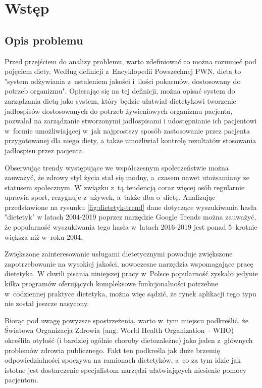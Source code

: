\chapter*{Wstęp}\label{ch:admission}

\section*{Opis problemu}\label{sec:problem-description}

Przed przejściem do analizy problemu, warto zdefiniować co można rozumieć pod pojęciem diety.
Według definicji z~Encyklopedii Powszechnej PWN, dieta to "system odżywiania z~ustaleniem jakości i~ilości pokarmów,
dostosowany do potrzeb organizmu"\cite{book:encyklopedia-dieta}.
Opierając się na tej definicji, można opisać system do zarządzania dietą jako system,
który będzie ułatwiał dietetykowi tworzenie jadłospisów dostosowanych do potrzeb żywieniowych organizmu pacjenta, pozwalał na zarządzanie stworzonymi jadłospisami
i udostępnianie ich pacjentowi w~formie umożliwiającej w~jak najprostszy sposób zastosowanie przez pacjenta przygotowanej dla niego diety,
a także umożliwiał kontrolę rezultatów stosowania jadłospisu przez pacjenta.

\par
Obserwując trendy występujące we współczesnym społeczeństwie można zauważyć, że zdrowy styl życia stał się modny, a~czasem nawet utożsamiany ze statusem społecznym.
W związku z~tą tendencją coraz więcej osób regularnie uprawia sport, rezygnuje z~używek, a~także dba o~dietę.
Analizując przedstawione na rysunku \ref{fig:dietetyk-trend} dane dotyczące wyszukiwania hasła "dietetyk" w latach 2004-2019 poprzez narzędzie Google Trends\cite{url:google-trends} można zauważyć,
że popularność wyszukiwania tego hasła w~latach 2016-2019 jest ponad 5~krotnie większa niż w~roku 2004.


Zwiększone zainteresowanie usługami dietetycznymi powoduje zwiększone zapotrzebowanie na wysokiej jakości, nowoczesne narzędzia wspomagające pracę dietetyka.
W chwili pisania niniejszej pracy w~Polsce popularność zyskało jedynie kilka programów oferujących kompleksowe funkcjonalności potrzebne w~codziennej praktyce dietetyka,
można więc sądzić, że rynek aplikacji tego typu nie został jeszcze nasycony.

\par
Biorąc pod uwagę powyższe spostrzeżenia, warto w~tym miejscu podkreślić, że Światowa Organizacja Zdrowia (ang. World Health Organization~- WHO) określiła otyłość
(i bardziej ogólnie choroby dietozależne) jako jeden z~głównych problemów zdrowia publicznego\cite{article:dietetyk-na-rynku-uslug-medycznych}.
Fakt ten podkreśla jak duże brzemię odpowiedzialności spoczywa na ramionach dietetyków,
a~co za tym idzie jak istotne jest dostarczenie specjalistom narzędzi ułatwiających niesienie pomocy pacjentom.

